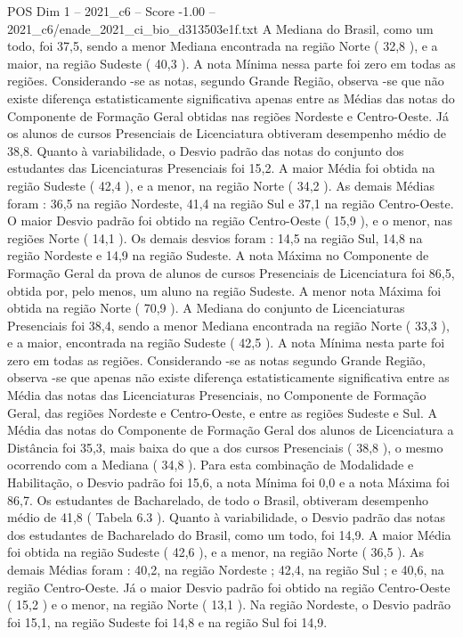 \begin{textsample}{POS Dim 1 – 2021\_c6 – Score -1.00 – 2021\_c6/enade\_2021\_ci\_bio\_d313503e1f.txt}
A Mediana do Brasil, como um todo, foi 37,5, sendo a menor Mediana encontrada na região Norte ( 32,8 ), e a maior, na região Sudeste ( 40,3 ).
A nota Mínima nessa parte foi zero em todas as regiões.
Considerando -se as notas, segundo Grande Região, observa -se que não existe diferença estatisticamente significativa apenas entre as Médias das notas do Componente de Formação Geral obtidas nas regiões Nordeste e Centro-Oeste.
Já os alunos de cursos Presenciais de Licenciatura obtiveram desempenho médio de 38,8.
Quanto à variabilidade, o Desvio padrão das notas do conjunto dos estudantes das Licenciaturas Presenciais foi 15,2.
A maior Média foi obtida na região Sudeste ( 42,4 ), e a menor, na região Norte ( 34,2 ).
As demais Médias foram : 36,5 na região Nordeste, 41,4 na região Sul e 37,1 na região Centro-Oeste.
O maior Desvio padrão foi obtido na região Centro-Oeste ( 15,9 ), e o menor, nas regiões Norte ( 14,1 ).
Os demais desvios foram : 14,5 na região Sul, 14,8 na região Nordeste e 14,9 na região Sudeste.
A nota Máxima no Componente de Formação Geral da prova de alunos de cursos Presenciais de Licenciatura foi 86,5, obtida por, pelo menos, um aluno na região Sudeste.
A menor nota Máxima foi obtida na região Norte ( 70,9 ).
A Mediana do conjunto de Licenciaturas Presenciais foi 38,4, sendo a menor Mediana encontrada na região Norte ( 33,3 ), e a maior, encontrada na região Sudeste ( 42,5 ).
A nota Mínima nesta parte foi zero em todas as regiões.
Considerando -se as notas segundo Grande Região, observa -se que apenas não existe diferença estatisticamente significativa entre as Média das notas das Licenciaturas Presenciais, no Componente de Formação Geral, das regiões Nordeste e Centro-Oeste, e entre as regiões Sudeste e Sul.
A Média das notas do Componente de Formação Geral dos alunos de Licenciatura a Distância foi 35,3, mais baixa do que a dos cursos Presenciais ( 38,8 ), o mesmo ocorrendo com a Mediana ( 34,8 ).
Para esta combinação de Modalidade e Habilitação, o Desvio padrão foi 15,6, a nota Mínima foi 0,0 e a nota Máxima foi 86,7.
Os estudantes de Bacharelado, de todo o Brasil, obtiveram desempenho médio de 41,8 ( Tabela 6.3 ).
Quanto à variabilidade, o Desvio padrão das notas dos estudantes de Bacharelado do Brasil, como um todo, foi 14,9.
A maior Média foi obtida na região Sudeste ( 42,6 ), e a menor, na região Norte ( 36,5 ).
As demais Médias foram : 40,2, na região Nordeste ; 42,4, na região Sul ; e 40,6, na região Centro-Oeste.
Já o maior Desvio padrão foi obtido na região Centro-Oeste ( 15,2 ) e o menor, na região Norte ( 13,1 ).
Na região Nordeste, o Desvio padrão foi 15,1, na região Sudeste foi 14,8 e na região Sul foi 14,9.

\end{textsample}
